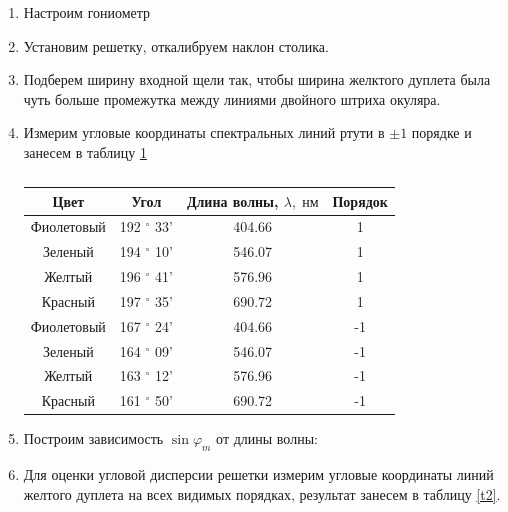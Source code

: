 \documentclass[a4paper,12pt]{article}
\theoremstyle{plain} %
\theoremstyle{definition} %
\theoremstyle{remark} %
\begin{document}
\begin{enumerate}
	\item Настроим гониометр
	\item Установим решетку, откалибруем наклон столика.
	\item Подберем ширину входной щели так, чтобы ширина желктого дуплета была чуть больше промежутка между линиями двойного штриха окуляра.
	\item Измерим угловые координаты спектральных линий ртути в $\pm 1$ порядке и занесем в таблицу \ref{t1}
	
	\begin{table}[h!]
		\begin{center}
			\begin{tabular}{|c|c|c|c|}
				\hline
				Цвет & Угол & Длина волны, $\lambda, \; нм$ & Порядок \\ \hline 
				Фиолетовый & 192 $^{\circ}$ 33'&404.66& 1\\ \hline
				Зеленый & 194 $^{\circ}$ 10' & 546.07 & 1 \\\hline
				Желтый & 196 $^{\circ}$ 41' &576.96 & 1 \\ \hline
				Красный & 197 $^{\circ}$ 35' & 690.72 & 1\\ \hline
				Фиолетовый & 167 $^{\circ}$ 24' & 404.66 & -1 \\ \hline 
				Зеленый & 164 $^{\circ}$ 09' & 546.07 & -1 \\\hline
				Желтый & 163 $^{\circ}$ 12' &576.96 & -1 \\ \hline
				Красный & 161 $^{\circ}$ 50' & 690.72 & -1\\ \hline
				
			\end{tabular}
			\caption{}
			\label{t1}
		\end{center}
	\end{table}
	
	\item Построим зависимость $\sin{\varphi_m}$ от длины волны:
	
	\item Для оценки угловой дисперсии решетки измерим угловые координаты линий желтого дуплета на всех видимых порядках, результат занесем в таблицу \ref{t2}.
	

\end{enumerate}
\end{document}
